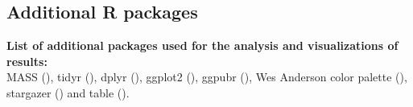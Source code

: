 \subsection{Additional R packages}
\label{app:packages}

\textbf{List of additional packages used for the analysis and visualizations of results:}\\

MASS (\cite{MASS}), tidyr (\cite{tidyr}), dplyr (\cite{dplyr}), ggplot2 (\cite{ggplot2}), ggpubr (\cite{ggpubr}), Wes Anderson color palette (\cite{wesanderson}), stargazer (\cite{stargazer}) and table (\cite{xtable}).